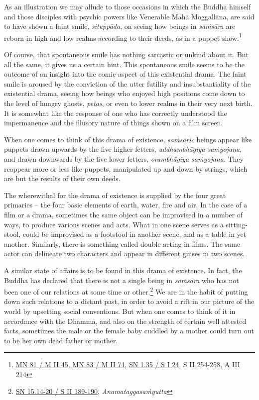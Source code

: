As an illustration we may allude to those occasions in which the Buddha himself and those disciples with psychic powers like Venerable Mahā Moggallāna, are said to have shown a faint smile, \emph{situppāda}, on seeing how beings in \emph{saṁsāra} are reborn in high and low realms according to their deeds, as in a puppet show.\footnote{\href{https://suttacentral.net/mn81/pli/ms}{MN 81 / M II 45}, \href{https://suttacentral.net/mn83/pli/ms}{MN 83 / M II 74}, \href{https://suttacentral.net/sn1.35/pli/ms}{SN 1.35 / S I 24}, S II 254-258, A III 214}

Of course, that spontaneous smile has nothing sarcastic or unkind about it. But all the same, it gives us a certain hint. This spontaneous smile seems to be the outcome of an insight into the comic aspect of this existential drama. The faint smile is aroused by the conviction of the utter futility and insubstantiality of the existential drama, seeing how beings who enjoyed high positions come down to the level of hungry ghosts, \emph{petas}, or even to lower realms in their very next birth. It is somewhat like the response of one who has correctly understood the impermanence and the illusory nature of things shown on a film screen.

When one comes to think of this drama of existence, \emph{saṁsāric} beings appear like puppets drawn upwards by the five higher fetters, \emph{uddhambhāgiya saṁyojana}, and drawn downwards by the five lower fetters, \emph{orambhāgiya saṁyojana}. They reappear more or less like puppets, manipulated up and down by strings, which are but the results of their own deeds.

The wherewithal for the drama of existence is supplied by the four great primaries -- the four basic elements of earth, water, fire and air. In the case of a film or a drama, sometimes the same object can be improvised in a number of ways, to produce various scenes and acts. What in one scene serves as a sitting-stool, could be improvised as a footstool in another scene, and as a table in yet another. Similarly, there is something called double-acting in films. The same actor can delineate two characters and appear in different guises in two scenes.

A similar state of affairs is to be found in this drama of existence. In fact, the Buddha has declared that there is not a single being in \emph{saṁsāra} who has not been one of our relations at some time or other.\footnote{\href{https://suttacentral.net/sn15.14/pli/ms}{SN 15.14-20 / S II 189-190}, \emph{Anamataggasaṁyutta}} We are in the habit of putting down such relations to a distant past, in order to avoid a rift in our picture of the world by upsetting social conventions. But when one comes to think of it in accordance with the Dhamma, and also on the strength of certain well attested facts, sometimes the male or the female baby cuddled by a mother could turn out to be her own dead father or mother.

